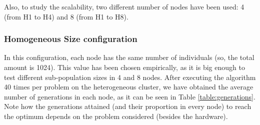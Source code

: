 \documentclass[final,1p,times]{elsarticle}
\begin{document}
\begin{table}
\end{table}

Also, to study the scalability, two different number of nodes have been used: 4 (from H1 to H4) and 8 (from H1 to H8).

\subsubsection{Homogeneous Size configuration}



In this configuration, each node has the same number of individuals (so, the total amount is 1024). This value has been chosen empirically, as it is big enough to test different sub-population sizes in 4 and 8 nodes. After executing the algorithm 40 times per problem on the heterogeneous cluster, we have obtained the average number of generations in each node, as it can be seen in Table \ref{table:generations}. Note how the generations attained (and their proportion in every node) to reach the optimum depends on the problem considered (besides the hardware).
\end{document}
